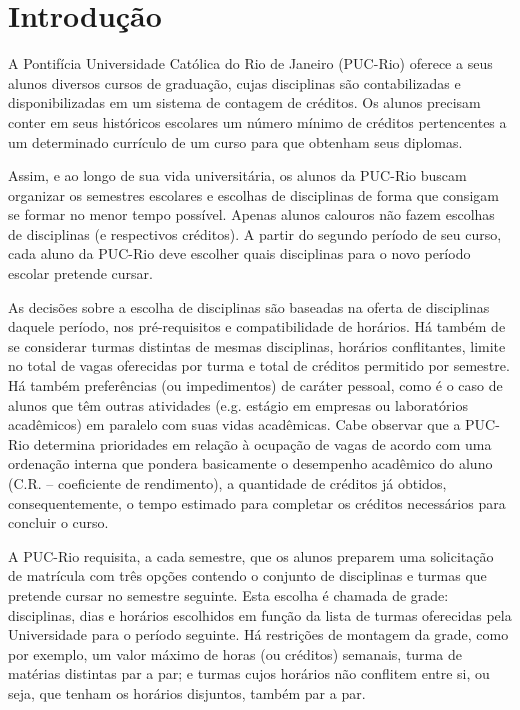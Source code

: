 \documentclass[graduacao,brazil]{ThesisPUC}
\begin{document}

\chapter{Introdu\c{c}\~ao}

A Pontifícia Universidade Católica do Rio de Janeiro (PUC-Rio) oferece a seus alunos diversos cursos de graduação, cujas disciplinas são contabilizadas e disponibilizadas em um sistema de contagem de créditos. Os alunos precisam conter em seus históricos escolares um número mínimo de créditos pertencentes a um determinado currículo de um curso para que obtenham seus diplomas. 

Assim, e ao longo de sua vida universitária, os alunos da PUC-Rio buscam organizar os semestres escolares e escolhas de disciplinas de forma que consigam se formar no menor tempo possível. Apenas alunos calouros não fazem escolhas de disciplinas (e respectivos créditos). A partir do segundo período de seu curso, cada aluno da PUC-Rio deve escolher quais disciplinas para o novo período escolar pretende cursar.

As decisões sobre a escolha de disciplinas são baseadas na oferta de disciplinas daquele período, nos pré-requisitos e compatibilidade de horários. Há também de se considerar turmas distintas de mesmas disciplinas, horários conflitantes, limite no total de vagas oferecidas por turma e total de créditos permitido por semestre. Há também preferências (ou impedimentos) de caráter pessoal, como é o caso de alunos que têm outras atividades (e.g. estágio em empresas ou laboratórios acadêmicos) em paralelo com suas vidas acadêmicas. Cabe observar que a PUC-Rio determina prioridades em relação à ocupação de vagas de acordo com uma ordenação interna que pondera basicamente o desempenho acadêmico do aluno (C.R. – coeficiente de rendimento), a quantidade de créditos já obtidos, consequentemente, o tempo estimado para completar os créditos necessários para concluir o curso.

A PUC-Rio requisita, a cada semestre, que os alunos preparem uma solicitação de matrícula com três opções contendo o conjunto de disciplinas e turmas que pretende cursar no semestre seguinte. Esta escolha é chamada de grade: disciplinas, dias e horários escolhidos em função da lista de turmas oferecidas pela Universidade para o período seguinte. Há restrições de montagem da grade, como por exemplo, um valor máximo de horas (ou créditos) semanais, turma de matérias distintas par a par; e turmas cujos horários não conflitem entre si, ou seja, que tenham os horários disjuntos, também par a par.
\end{document}

